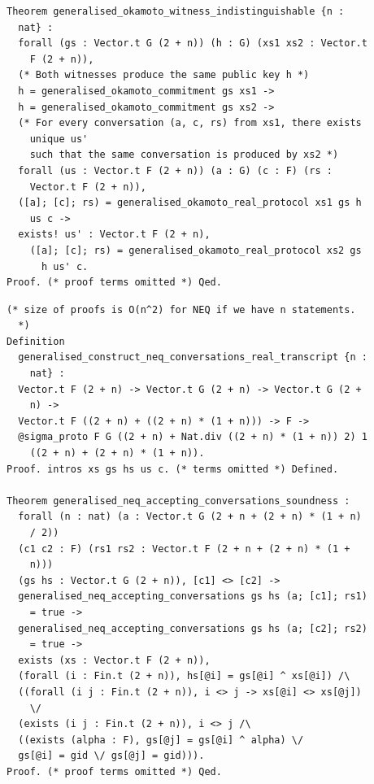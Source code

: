 \begin{lstlisting}[frame=single, language=Coq, caption={Witness Indistinguishability},
label={wit_ind},captionpos=t, basicstyle=\ttfamily\scriptsize,
abovecaptionskip=-\medskipamount]
Theorem generalised_okamoto_witness_indistinguishable {n :
  nat} :
  forall (gs : Vector.t G (2 + n)) (h : G) (xs1 xs2 : Vector.t
    F (2 + n)),
  (* Both witnesses produce the same public key h *)
  h = generalised_okamoto_commitment gs xs1 ->
  h = generalised_okamoto_commitment gs xs2 ->
  (* For every conversation (a, c, rs) from xs1, there exists
    unique us' 
    such that the same conversation is produced by xs2 *)
  forall (us : Vector.t F (2 + n)) (a : G) (c : F) (rs :
    Vector.t F (2 + n)),
  ([a]; [c]; rs) = generalised_okamoto_real_protocol xs1 gs h
    us c ->
  exists! us' : Vector.t F (2 + n),
    ([a]; [c]; rs) = generalised_okamoto_real_protocol xs2 gs
      h us' c.
Proof. (* proof terms omitted *) Qed.
\end{lstlisting}

\begin{lstlisting}[frame=single, language=Coq, caption={Neq $\Sigma$ Protocol},
label={neq_special_sound},captionpos=t, basicstyle=\ttfamily\scriptsize,
abovecaptionskip=-\medskipamount]
(* size of proofs is O(n^2) for NEQ if we have n statements.
  *) 
Definition
  generalised_construct_neq_conversations_real_transcript {n :
    nat} : 
  Vector.t F (2 + n) -> Vector.t G (2 + n) -> Vector.t G (2 +
    n) -> 
  Vector.t F ((2 + n) + ((2 + n) * (1 + n))) -> F ->
  @sigma_proto F G ((2 + n) + Nat.div ((2 + n) * (1 + n)) 2) 1
    ((2 + n) + (2 + n) * (1 + n)).
Proof. intros xs gs hs us c. (* terms omitted *) Defined. 

Theorem generalised_neq_accepting_conversations_soundness :
  forall (n : nat) (a : Vector.t G (2 + n + (2 + n) * (1 + n)
    / 2)) 
  (c1 c2 : F) (rs1 rs2 : Vector.t F (2 + n + (2 + n) * (1 +
    n))) 
  (gs hs : Vector.t G (2 + n)), [c1] <> [c2] ->
  generalised_neq_accepting_conversations gs hs (a; [c1]; rs1)
    = true ->
  generalised_neq_accepting_conversations gs hs (a; [c2]; rs2)
    = true ->
  exists (xs : Vector.t F (2 + n)), 
  (forall (i : Fin.t (2 + n)), hs[@i] = gs[@i] ^ xs[@i]) /\
  ((forall (i j : Fin.t (2 + n)), i <> j -> xs[@i] <> xs[@j])
    \/
  (exists (i j : Fin.t (2 + n)), i <> j /\ 
  ((exists (alpha : F), gs[@j] = gs[@i] ^ alpha) \/ 
  gs[@i] = gid \/ gs[@j] = gid))).
Proof. (* proof terms omitted *) Qed.
\end{lstlisting}

